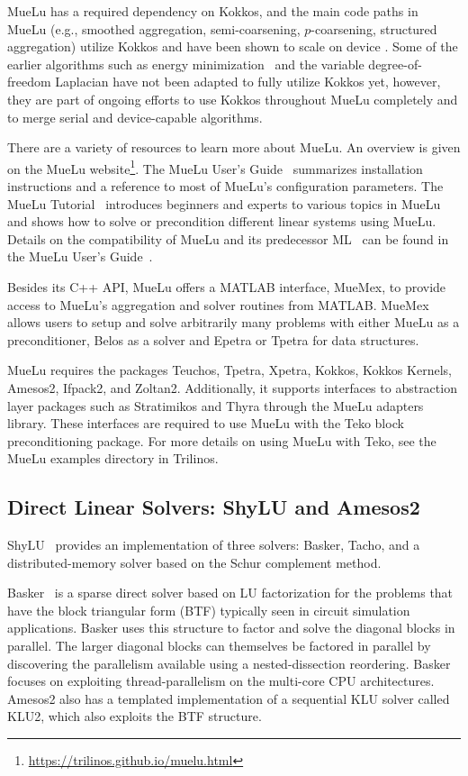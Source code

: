 MueLu has a required dependency on Kokkos,
and the main code paths in MueLu (e.g., smoothed aggregation, semi-coarsening, $p$-coarsening, structured aggregation)
utilize Kokkos and have been shown to scale on device \cite{BettencourtBrownEtAl2021_EmpirePic}.
Some of the earlier algorithms such as energy minimization~\cite{Sala2008a} and the variable degree-of-freedom Laplacian have not been adapted to fully utilize Kokkos yet,
however, they are part of ongoing efforts to use Kokkos throughout MueLu completely and to merge serial and device-capable algorithms.

There are a variety of resources to learn more about MueLu.
An overview is given on the MueLu website\footnote{\url{https://trilinos.github.io/muelu.html}}.
The MueLu User's Guide~\cite{BergerVergiat2023a} summarizes installation instructions and a reference to most of MueLu's configuration parameters.
The MueLu Tutorial~\cite{Mayr2023b} introduces beginners and experts to various topics in MueLu and shows how to solve or precondition different linear systems using MueLu.
Details on the compatibility of MueLu and its predecessor ML~\cite{Heroux2005a,Gee2006a} can be found in the MueLu User's Guide~\cite{BergerVergiat2023a}.

Besides its C++ API, MueLu offers a MATLAB interface, MueMex, to provide access to MueLu's aggregation and solver routines from MATLAB.
MueMex allows users to setup and solve arbitrarily many problems with either MueLu as a preconditioner, Belos as a solver and Epetra or Tpetra for data structures.

MueLu requires the packages Teuchos, Tpetra, Xpetra, Kokkos, Kokkos Kernels, Amesos2, Ifpack2, and Zoltan2. Additionally, it supports interfaces to abstraction layer packages such as Stratimikos and Thyra through the MueLu adapters library. These interfaces are required to use MueLu with the Teko block preconditioning package. For more details on using MueLu with Teko, see the MueLu examples directory in Trilinos.

\subsection{Direct Linear Solvers: ShyLU and Amesos2}

ShyLU~\cite{ShyLUCore2014} provides an implementation of three solvers: Basker, Tacho, and a distributed-memory solver based on the Schur complement method.

Basker~\cite{Basker2017} is a sparse direct solver based on LU factorization for the problems that have the block triangular form (BTF) typically seen in circuit simulation applications. Basker uses this structure to factor and solve the diagonal blocks in parallel. The larger diagonal blocks can themselves be factored in parallel by discovering the parallelism available using a nested-dissection reordering. Basker focuses on exploiting thread-parallelism on the multi-core CPU architectures. %
Amesos2 also has a templated implementation of a sequential KLU solver called KLU2, which also exploits the BTF structure.

